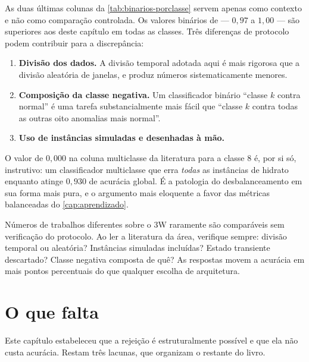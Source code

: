 As duas últimas colunas da \cref{tab:binarios-porclasse} servem apenas como contexto e
não como comparação controlada. Os valores
binários de \citet{Marins2021} --- $0{,}97$ a $1{,}00$ --- são superiores aos deste
capítulo em todas as classes. Três diferenças de protocolo podem contribuir para a
discrepância:

\begin{enumerate}[leftmargin=*,itemsep=0.3em]
  \item \textbf{Divisão dos dados.} A divisão temporal adotada aqui é mais rigorosa que
        a divisão aleatória de janelas, e produz números sistematicamente menores.
  \item \textbf{Composição da classe negativa.} Um classificador binário
        ``classe $k$ contra normal'' é uma tarefa substancialmente mais fácil que
        ``classe $k$ contra todas as outras oito anomalias mais normal''.
  \item \textbf{Uso de instâncias simuladas e desenhadas à mão.}
\end{enumerate}

O valor de $0{,}000$ na coluna multiclasse da literatura para a classe 8 é, por si só,
instrutivo: um classificador multiclasse que erra \emph{todas} as instâncias de hidrato
enquanto atinge $0{,}930$ de acurácia global. É a patologia do desbalanceamento em sua
forma mais pura, e o argumento mais eloquente a favor das métricas balanceadas do
\cref{cap:aprendizado}.

\begin{destaque}
Números de trabalhos diferentes sobre o 3W raramente são comparáveis sem verificação do
protocolo. Ao ler a literatura da área, verifique sempre: divisão temporal ou aleatória?
Instâncias simuladas incluídas? Estado transiente descartado? Classe negativa composta
de quê? As respostas movem a acurácia em mais pontos percentuais do que qualquer escolha
de arquitetura.
\end{destaque}

\section{O que falta}

Este capítulo estabeleceu que a rejeição é estruturalmente possível e que ela não custa
acurácia. Restam três lacunas, que organizam o restante do livro.

